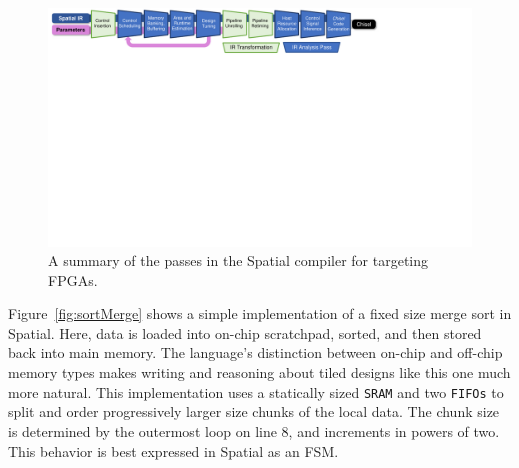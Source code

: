 \begin{figure}
\centering
\includegraphics[clip, trim=0.3cm 15.4cm 7.7cm 0.0cm, width=\linewidth]{figs/compiler_flow.pdf}
\caption{A summary of the passes in the Spatial compiler for targeting FPGAs.}
\label{fig:compilerflow}
\end{figure}


Figure~\ref{fig:sortMerge} shows a simple implementation of a fixed size merge sort in Spatial. Here, data is loaded into on-chip scratchpad, sorted, and then stored back into main memory.
The language's distinction between on-chip and off-chip memory types makes writing and reasoning about tiled designs like this one much more natural.
This implementation uses a statically sized \texttt{\small{SRAM}} and two \texttt{\small{FIFOs}} to split and order progressively larger size chunks of the local data.
The chunk size is determined by the outermost loop on line 8, and increments in powers of two. This behavior is best expressed in Spatial as an FSM.
